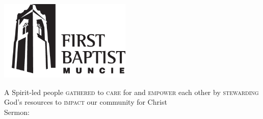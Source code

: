 

\begin{titlepage}
\centering
\vfill
{\centering
\includegraphics[height=1.5in]{external/fbc-logo-bw}\par}
\vfill
\large A Spirit-led people \textsc{gathered} to \textsc{care} for and \textsc{empower} each other by  \textsc{stewarding} God's resources to \textsc{impact} our community for Christ
\vfill
\LARGE\sundaydate\\
\vfill
\large Sermon:\\
\LARGE\sermontitle\\
\LARGE\scripture\\
\vfill
\end{titlepage}
\thispagestyle{empty}